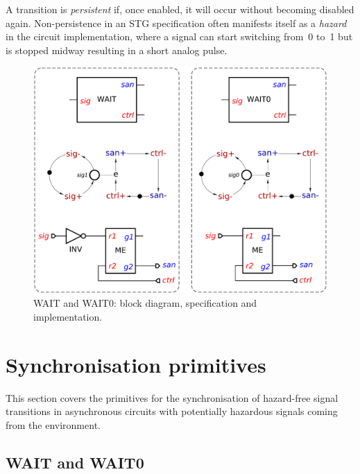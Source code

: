 \documentclass[conference]{IEEEtran}
\begin{document}
A transition is \emph{persistent} if, once enabled, it will occur without becoming
disabled again. Non-persistence in an STG specification
often manifests itself as a \emph{hazard} in the circuit implementation, where a signal
can start switching from~0 to~1 but is stopped midway resulting in a short analog pulse.


\begin{figure}
\begin{center}
    \includegraphics[scale=0.23]{fig/WAIT.pdf}
    \caption{\textsf{WAIT} and \textsf{WAIT0}: block diagram,
    specification and implementation.}
    \label{fig:wait}
    \vspace{-4mm}
\end{center}
\end{figure}

\section{Synchronisation primitives}\label{sec-sync}

This section covers the primitives for the synchronisation of hazard-free signal
transitions in asynchronous circuits with potentially hazardous signals coming
from the environment.

\subsection{\textsf{WAIT} and \textsf{WAIT0}}
\end{document}
